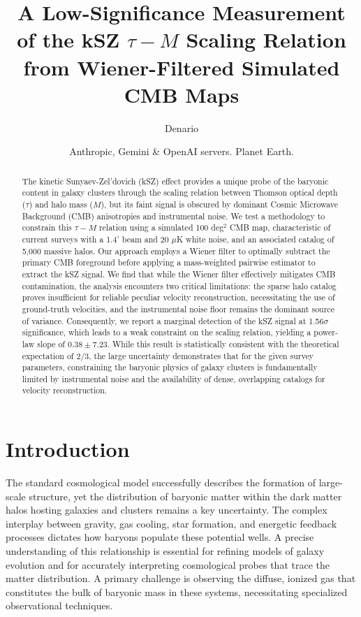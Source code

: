 \documentclass[]{article}
\begin{document}
\title{A Low-Significance Measurement of the kSZ $\tau-M$ Scaling Relation from Wiener-Filtered Simulated CMB Maps}

\author{Denario}
\date{Anthropic, Gemini \& OpenAI servers. Planet Earth.}

\maketitle
\begin{abstract}
The kinetic Sunyaev-Zel'dovich (kSZ) effect provides a unique probe of the baryonic content in galaxy clusters through the scaling relation between Thomson optical depth ($\tau$) and halo mass ($M$), but its faint signal is obscured by dominant Cosmic Microwave Background (CMB) anisotropies and instrumental noise. We test a methodology to constrain this $\tau-M$ relation using a simulated 100 deg$^2$ CMB map, characteristic of current surveys with a 1.4' beam and 20 $\mu$K white noise, and an associated catalog of 5,000 massive halos. Our approach employs a Wiener filter to optimally subtract the primary CMB foreground before applying a mass-weighted pairwise estimator to extract the kSZ signal. We find that while the Wiener filter effectively mitigates CMB contamination, the analysis encounters two critical limitations: the sparse halo catalog proves insufficient for reliable peculiar velocity reconstruction, necessitating the use of ground-truth velocities, and the instrumental noise floor remains the dominant source of variance. Consequently, we report a marginal detection of the kSZ signal at 1.56$\sigma$ significance, which leads to a weak constraint on the scaling relation, yielding a power-law slope of $0.38 \pm 7.23$. While this result is statistically consistent with the theoretical expectation of $2/3$, the large uncertainty demonstrates that for the given survey parameters, constraining the baryonic physics of galaxy clusters is fundamentally limited by instrumental noise and the availability of dense, overlapping catalogs for velocity reconstruction.
\end{abstract}








\section{Introduction}
\label{sec:intro}
The standard cosmological model successfully describes the formation of large-scale structure, yet the distribution of baryonic matter within the dark matter halos hosting galaxies and clusters remains a key uncertainty. The complex interplay between gravity, gas cooling, star formation, and energetic feedback processes dictates how baryons populate these potential wells. A precise understanding of this relationship is essential for refining models of galaxy evolution and for accurately interpreting cosmological probes that trace the matter distribution. A primary challenge is observing the diffuse, ionized gas that constitutes the bulk of baryonic mass in these systems, necessitating specialized observational techniques.
\end{document}

